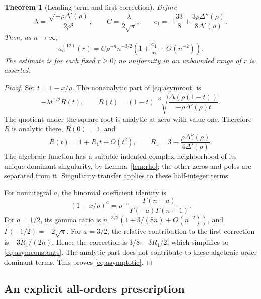 \documentclass[11pt,letterpaper]{article}
\numberwithin{equation}{section}
\newtheorem{theorem}{Theorem}[section]
\theoremstyle{definition}
\begin{document}
\begin{theorem}[Leading term and first correction]
\label{thm:asymptotic}
Define
\begin{equation}
 \lambda=\frac{\sqrt{-\rho\Delta'(\rho)}}{2\rho^3},\qquad
 C=\frac{\lambda}{2\sqrt\pi},\qquad
 c_1=-\frac{33}{8}+\frac{3\rho\Delta''(\rho)}{8\Delta'(\rho)}.
 \label{eq:asymconstants}
\end{equation}
Then, as \(n\to\infty\),
\begin{equation}
 a_n^{(12)}(r)=C\rho^{-n}n^{-3/2}
             \left(1+\frac{c_1}{n}+O(n^{-2})\right).
 \label{eq:asymptotic}
\end{equation}
The estimate is for each fixed \(r\geq0\); no uniformity in an unbounded
range of \(r\) is asserted.
\end{theorem}
\begin{proof}
Set \(t=1-x/\rho\). The nonanalytic part of \eqref{eq:asymroot} is
\begin{equation}
 -\lambda t^{1/2}R(t),\qquad
 R(t)=(1-t)^{-3}
 \sqrt{\frac{\Delta(\rho(1-t))}{-\rho\Delta'(\rho)t}}.
 \label{eq:R}
\end{equation}
The quotient under the square root is analytic at zero with value one.
Therefore \(R\) is analytic there, \(R(0)=1\), and
\begin{equation}
 R(t)=1+R_1t+O(t^2),\qquad
 R_1=3-\frac{\rho\Delta''(\rho)}{4\Delta'(\rho)}.
 \label{eq:R1}
\end{equation}
The algebraic function has a suitable indented complex neighborhood of its
unique dominant singularity, by Lemma~\ref{lem:rho}; the other zeros and
poles are separated from it. Singularity transfer \cite{FlajoletOdlyzko}
applies to these half-integer terms.

For nonintegral \(a\), the binomial coefficient identity is
\begin{equation}
 [x^n](1-x/\rho)^a
 =\rho^{-n}\frac{\Gamma(n-a)}{\Gamma(-a)\Gamma(n+1)}.
 \label{eq:gammaidentity}
\end{equation}
For \(a=1/2\), its gamma ratio is
\(n^{-3/2}(1+3/(8n)+O(n^{-2}))\), and
\(\Gamma(-1/2)=-2\sqrt\pi\). For \(a=3/2\), the relative contribution
to the first correction is \(-3R_1/(2n)\). Hence the correction is
\(3/8-3R_1/2\), which simplifies to \eqref{eq:asymconstants}.
The analytic part does not contribute to these algebraic-order dominant
terms. This proves \eqref{eq:asymptotic}.
\end{proof}

\subsection{An explicit all-orders prescription}
\end{document}
